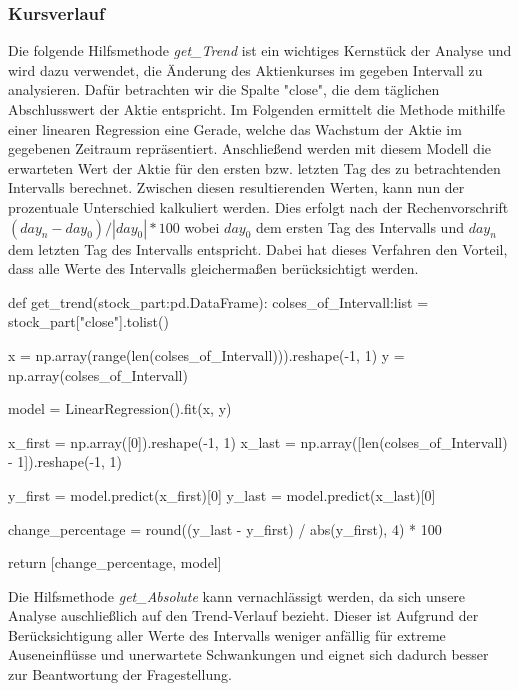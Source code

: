 \documentclass{article}
\begin{document}
\subsubsection{Kursverlauf}
Die folgende Hilfsmethode \textit{get\_Trend} ist ein wichtiges Kernstück der Analyse und wird dazu verwendet, die Änderung des Aktienkurses im gegeben Intervall zu analysieren.
Dafür betrachten wir die Spalte "close", die dem täglichen Abschlusswert der Aktie entspricht.
Im Folgenden ermittelt die Methode mithilfe einer linearen Regression eine Gerade, welche das Wachstum der Aktie im gegebenen Zeitraum repräsentiert.
Anschließend werden mit diesem Modell die erwarteten Wert der Aktie für den ersten bzw. letzten Tag des zu betrachtenden Intervalls berechnet.
Zwischen diesen resultierenden Werten, kann nun der prozentuale Unterschied kalkuliert werden.
Dies erfolgt nach der Rechenvorschrift $ (day_{n} - day_{0}) / |day_{0}| * 100 $ wobei $day_{0}$ dem ersten Tag des Intervalls und $day_{n}$ dem letzten Tag des Intervalls entspricht. 
Dabei hat dieses Verfahren den Vorteil, dass alle Werte des Intervalls gleichermaßen berücksichtigt werden.
\begin{python}
def get_trend(stock_part:pd.DataFrame):
    colses_of_Intervall:list = stock_part["close"].tolist()
    
    x = np.array(range(len(colses_of_Intervall))).reshape(-1, 1)
    y = np.array(colses_of_Intervall)

    model = LinearRegression().fit(x, y)

    x_first = np.array([0]).reshape(-1, 1)
    x_last = np.array([len(colses_of_Intervall) - 1]).reshape(-1, 1)

    y_first = model.predict(x_first)[0]
    y_last = model.predict(x_last)[0]

    change_percentage = round((y_last - y_first) / abs(y_first), 4) * 100

    return [change_percentage, model]
\end{python}
Die Hilfsmethode \textit{get\_Absolute} kann vernachlässigt werden, da sich unsere Analyse auschließlich auf den Trend-Verlauf bezieht.
Dieser ist Aufgrund der Berücksichtigung aller Werte des Intervalls weniger anfällig für extreme Auseneinflüsse und unerwartete Schwankungen und eignet sich dadurch besser zur Beantwortung der Fragestellung.
\end{document}
